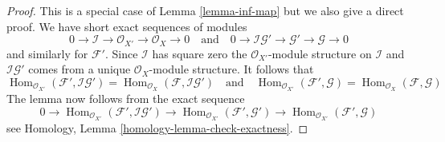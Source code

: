 \documentclass[10pt,a4paper]{amsart}
\theoremstyle{plain}
\theoremstyle{definition}
\theoremstyle{remark}
\numberwithin{equation}{subsection}
\def\Hom{\mathop{\mathrm{Hom}}\nolimits}
\begin{document}
\begin{proof}
This is a special case of Lemma \ref{lemma-inf-map} but we also
give a direct proof. We have short exact sequences of modules
$$
0 \to \mathcal{I} \to \mathcal{O}_{X'} \to \mathcal{O}_X \to 0
\quad\text{and}\quad
0 \to \mathcal{I}\mathcal{G}' \to \mathcal{G}' \to \mathcal{G} \to 0
$$
and similarly for $\mathcal{F}'$.
Since $\mathcal{I}$ has square zero the $\mathcal{O}_{X'}$-module
structure on $\mathcal{I}$ and $\mathcal{I}\mathcal{G}'$ comes from
a unique $\mathcal{O}_X$-module structure. It follows that
$$
\Hom_{\mathcal{O}_{X'}}(\mathcal{F}', \mathcal{I}\mathcal{G}') =
\Hom_{\mathcal{O}_X}(\mathcal{F}, \mathcal{I}\mathcal{G}')
\quad\text{and}\quad
\Hom_{\mathcal{O}_{X'}}(\mathcal{F}', \mathcal{G}) =
\Hom_{\mathcal{O}_X}(\mathcal{F}, \mathcal{G})
$$
The lemma now follows from the exact sequence
$$
0 \to \Hom_{\mathcal{O}_{X'}}(\mathcal{F}', \mathcal{I}\mathcal{G}') \to
\Hom_{\mathcal{O}_{X'}}(\mathcal{F}', \mathcal{G}') \to
\Hom_{\mathcal{O}_{X'}}(\mathcal{F}', \mathcal{G})
$$
see Homology, Lemma \ref{homology-lemma-check-exactness}.
\end{proof}
\end{document}
